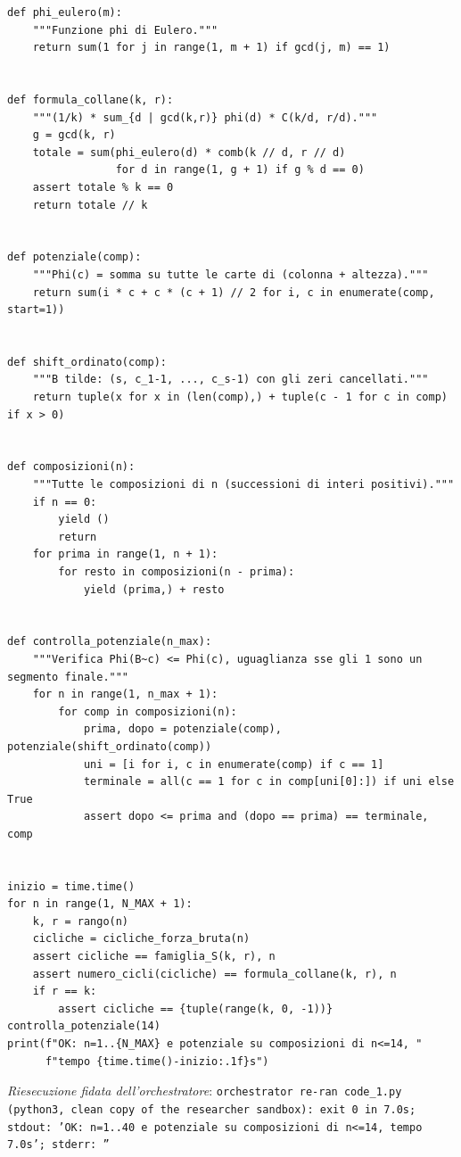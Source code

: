\documentclass[11pt,a4paper]{article}
\begin{document}
\begin{lstlisting}[caption={attempt\_002 code\_1 [python, rigore exact] — Exact brute-force check for n=1..40: cyclic partitions equal S\_\{k,r\}; number of cycles equ — approvato dal Referee}]
def phi_eulero(m):
    """Funzione phi di Eulero."""
    return sum(1 for j in range(1, m + 1) if gcd(j, m) == 1)


def formula_collane(k, r):
    """(1/k) * sum_{d | gcd(k,r)} phi(d) * C(k/d, r/d)."""
    g = gcd(k, r)
    totale = sum(phi_eulero(d) * comb(k // d, r // d)
                 for d in range(1, g + 1) if g % d == 0)
    assert totale % k == 0
    return totale // k


def potenziale(comp):
    """Phi(c) = somma su tutte le carte di (colonna + altezza)."""
    return sum(i * c + c * (c + 1) // 2 for i, c in enumerate(comp, start=1))


def shift_ordinato(comp):
    """B tilde: (s, c_1-1, ..., c_s-1) con gli zeri cancellati."""
    return tuple(x for x in (len(comp),) + tuple(c - 1 for c in comp) if x > 0)


def composizioni(n):
    """Tutte le composizioni di n (successioni di interi positivi)."""
    if n == 0:
        yield ()
        return
    for prima in range(1, n + 1):
        for resto in composizioni(n - prima):
            yield (prima,) + resto


def controlla_potenziale(n_max):
    """Verifica Phi(B~c) <= Phi(c), uguaglianza sse gli 1 sono un segmento finale."""
    for n in range(1, n_max + 1):
        for comp in composizioni(n):
            prima, dopo = potenziale(comp), potenziale(shift_ordinato(comp))
            uni = [i for i, c in enumerate(comp) if c == 1]
            terminale = all(c == 1 for c in comp[uni[0]:]) if uni else True
            assert dopo <= prima and (dopo == prima) == terminale, comp


inizio = time.time()
for n in range(1, N_MAX + 1):
    k, r = rango(n)
    cicliche = cicliche_forza_bruta(n)
    assert cicliche == famiglia_S(k, r), n
    assert numero_cicli(cicliche) == formula_collane(k, r), n
    if r == k:
        assert cicliche == {tuple(range(k, 0, -1))}
controlla_potenziale(14)
print(f"OK: n=1..{N_MAX} e potenziale su composizioni di n<=14, "
      f"tempo {time.time()-inizio:.1f}s")

\end{lstlisting}
\noindent\emph{Riesecuzione fidata dell'orchestratore}: \texttt{orchestrator re-ran code\_1.py (python3, clean copy of the researcher sandbox): exit 0 in 7.0s; stdout: 'OK: n=1..40 e potenziale su composizioni di n\textless{}=14, tempo 7.0s'; stderr: ''}
\end{document}
